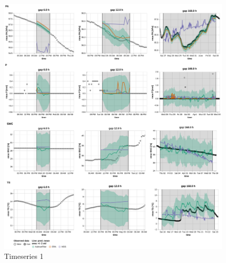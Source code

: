 \documentclass{article}
\newcommand{\imgwidth}{6in}
\begin{document}
\begin{figure}
\centerline{\includegraphics[width=\imgwidth]{images2/timeseries_2_1}}
\caption{Timeseries 1}
\label{fig:ts_2-2}
\end{figure}
\end{document}
